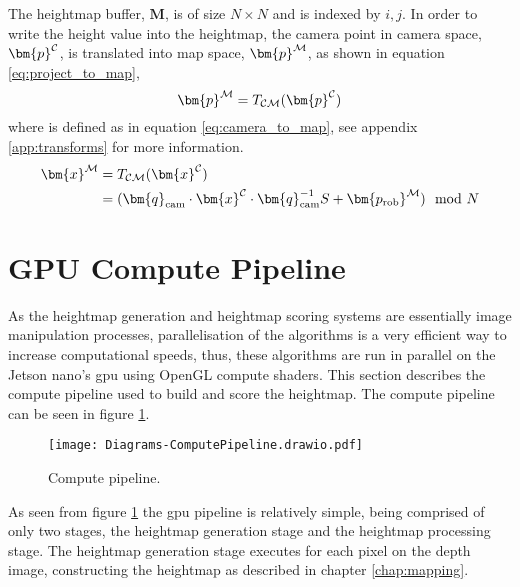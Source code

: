         \noindent
        The heightmap buffer, \(\bm{M}\), is of size \(N \times N\) and is indexed by \(i,j\). In order to write the height value into the heightmap, the camera point in camera space,
        \(\bm{p}\inrefframe{\fcamera}\), is translated into map space, \(\bm{p}\inrefframe{\fmap}\), as shown in equation \ref{eq:project_to_map},
        \begin{equation} \label{eq:project_to_map}
            \bm{p}\inrefframe{\fmap} = \transframe{\bm{p}\inrefframe{\fcamera}}{\fcamera}{\fmap}
        \end{equation}
        where  is defined as in equation \ref{eq:camera_to_map},
        see appendix \ref{app:transforms} for more information.
        \begin{align} \label{eq:camera_to_map}
            \begin{split}
                \bm{x}\inrefframe{\fmap} &= \transframe{\bm{x}\inrefframe{\fcamera}}{\fcamera}{\fmap}\\ 
                &= (\bm{q}_\text{cam} \cdot \bm{x}\inrefframe{\fcamera} \cdot \bm{q}_\text{cam}^{-1}S + \bm{p_\text{rob}}\inrefframe{\fmap}) \mod N
            \end{split}
        \end{align}

    \newpage
    \section{GPU Compute Pipeline}
        As the heightmap generation and heightmap scoring systems are essentially image manipulation processes, parallelisation of the algorithms
        is a very efficient way to increase computational speeds, thus, these algorithms are run in parallel on the Jetson nano's \ac{gpu} using OpenGL
        compute shaders. This section describes the compute pipeline used to build and score the heightmap. The compute pipeline can be seen in
        figure \ref{fig:compute_pipe}.
        \begin{figure}[h]
            \centering
            \texttt{[image: Diagrams-ComputePipeline.drawio.pdf]}
            \caption{Compute pipeline.}
            \label{fig:compute_pipe}
        \end{figure}
    
        \noindent
        As seen from figure \ref{fig:compute_pipe} the \ac{gpu} pipeline is relatively simple, being comprised of only two stages, the heightmap generation
        stage and the heightmap processing stage. The heightmap generation stage executes for each pixel on the depth image, constructing the heightmap as 
        described in chapter \ref{chap:mapping}.
        
